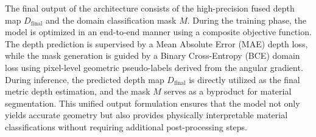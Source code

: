 \documentclass[lettersize,journal]{IEEEtran}
\begin{document}
The final output of the architecture consists of the high-precision fused depth map $D_{\text{final}}$ and the domain classification mask $M$. During the training phase, the model is optimized in an end-to-end manner using a composite objective function. The depth prediction is supervised by a Mean Absolute Error (MAE) depth loss, while the mask generation is guided by a Binary Cross-Entropy (BCE) domain loss using pixel-level geometric pseudo-labels derived from the angular gradient. During inference, the predicted depth map $D_{\text{final}}$ is directly utilized as the final metric depth estimation, and the mask $M$ serves as a byproduct for material segmentation. This unified output formulation ensures that the model not only yields accurate geometry but also provides physically interpretable material classifications without requiring additional post-processing steps.
\end{document}
